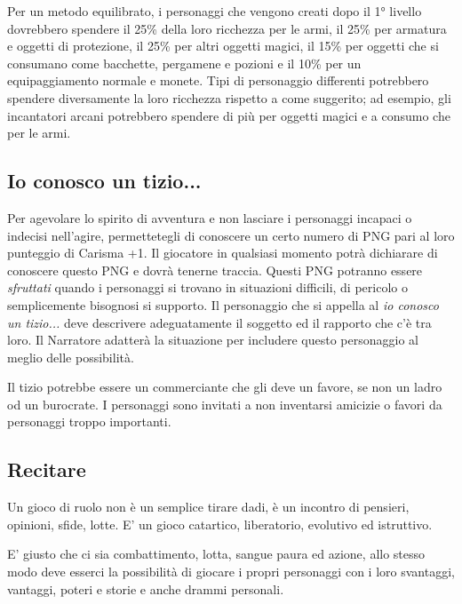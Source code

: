 \begin{multicols}{2}
Per un metodo equilibrato, i personaggi che vengono creati dopo il 1° livello dovrebbero spendere il 25\% della loro ricchezza per le armi, il 25\% per armatura e oggetti di protezione, il 25\% per altri oggetti magici, il 15\% per oggetti che si consumano come bacchette, pergamene e pozioni e il 10\% per un equipaggiamento normale e monete. Tipi di personaggio differenti potrebbero spendere diversamente la loro ricchezza rispetto a come suggerito; ad esempio, gli incantatori arcani potrebbero spendere di più per oggetti magici e a consumo che per le armi.

\subsection{Io conosco un tizio...}\label{ioconoscountizio}\hypertarget{ioconoscountizio}{}

Per agevolare lo spirito di avventura e non lasciare i personaggi incapaci o indecisi nell'agire, permettetegli di conoscere un certo numero di PNG pari al loro punteggio di Carisma +1. Il giocatore in qualsiasi momento potrà dichiarare di conoscere questo PNG e dovrà tenerne traccia. Questi PNG potranno essere \emph{sfruttati} quando i personaggi si trovano in situazioni difficili, di pericolo o semplicemente bisognosi si supporto. Il personaggio che si appella al \emph{io conosco un tizio...} deve descrivere adeguatamente il soggetto ed il rapporto che c'è tra loro. Il Narratore adatterà la situazione per includere questo personaggio al meglio delle possibilità.

Il tizio potrebbe essere un commerciante che gli deve un favore, se non un ladro od un burocrate. I personaggi sono invitati a non inventarsi amicizie o favori da personaggi troppo importanti.

\subsection{Recitare}\label{ruolare}

\label{recitare}

Un gioco di ruolo non è un semplice tirare dadi, è un incontro di pensieri, opinioni, sfide, lotte. E' un gioco catartico, liberatorio, evolutivo ed istruttivo.

E' giusto che ci sia combattimento, lotta, sangue paura ed azione, allo stesso modo deve esserci la possibilità di giocare i propri personaggi con i loro svantaggi, vantaggi, poteri e storie e anche drammi personali.


\end{multicols}

